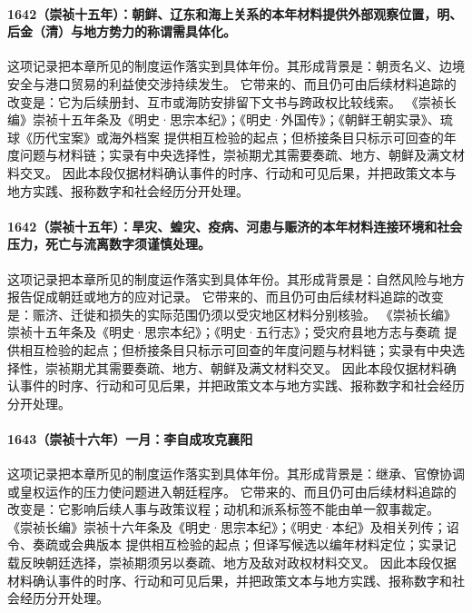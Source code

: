 \paragraph{1642（崇祯十五年）：朝鲜、辽东和海上关系的本年材料提供外部观察位置，明、后金（清）与地方势力的称谓需具体化。} 这项记录把本章所见的制度运作落实到具体年份。其形成背景是：朝贡名义、边境安全与港口贸易的利益使交涉持续发生。 它带来的、而且仍可由后续材料追踪的改变是：它为后续册封、互市或海防安排留下文书与跨政权比较线索。 《崇祯长编》崇祯十五年条及《明史·思宗本纪》；《明史·外国传》；《朝鲜王朝实录》、琉球《历代宝案》或海外档案 提供相互检验的起点；但桥接条目只标示可回查的年度问题与材料链；实录有中央选择性，崇祯期尤其需要奏疏、地方、朝鲜及满文材料交叉。 因此本段仅据材料确认事件的时序、行动和可见后果，并把政策文本与地方实践、报称数字和社会经历分开处理。

\paragraph{1642（崇祯十五年）：旱灾、蝗灾、疫病、河患与赈济的本年材料连接环境和社会压力，死亡与流离数字须谨慎处理。} 这项记录把本章所见的制度运作落实到具体年份。其形成背景是：自然风险与地方报告促成朝廷或地方的应对记录。 它带来的、而且仍可由后续材料追踪的改变是：赈济、迁徙和损失的实际范围仍须以受灾地区材料分别核验。 《崇祯长编》崇祯十五年条及《明史·思宗本纪》；《明史·五行志》；受灾府县地方志与奏疏 提供相互检验的起点；但桥接条目只标示可回查的年度问题与材料链；实录有中央选择性，崇祯期尤其需要奏疏、地方、朝鲜及满文材料交叉。 因此本段仅据材料确认事件的时序、行动和可见后果，并把政策文本与地方实践、报称数字和社会经历分开处理。

\paragraph{1643（崇祯十六年）一月：李自成攻克襄阳} 这项记录把本章所见的制度运作落实到具体年份。其形成背景是：继承、官僚协调或皇权运作的压力使问题进入朝廷程序。 它带来的、而且仍可由后续材料追踪的改变是：它影响后续人事与政策议程；动机和派系标签不能由单一叙事裁定。 《崇祯长编》崇祯十六年条及《明史·思宗本纪》；《明史·本纪》及相关列传；诏令、奏疏或会典版本 提供相互检验的起点；但译写候选以编年材料定位；实录记载反映朝廷选择，崇祯期须另以奏疏、地方及敌对政权材料交叉。 因此本段仅据材料确认事件的时序、行动和可见后果，并把政策文本与地方实践、报称数字和社会经历分开处理。

